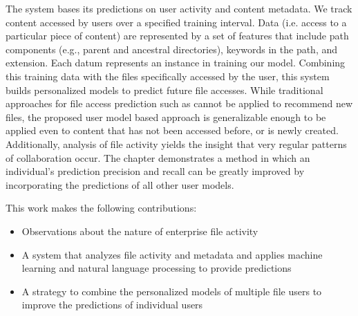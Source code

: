 {The system bases its predictions on user activity and content
metadata.  We track content accessed by users over a specified
training interval.  Data (i.e. access to a particular piece of
content) are represented by a set of features that include path
components (e.g., parent and ancestral directories), keywords in the
path, and extension.
Each datum represents an instance in training our model.  Combining
this training data with the files specifically accessed by the user,
this system builds personalized models to predict future file
accesses. While traditional approaches for file access prediction such
as \cite{yeh01-mascots,yeh01-ispass} cannot be applied to recommend
new files, the proposed user model based approach is generalizable
enough to be applied even to content that has not been accessed
before, or is newly created. Additionally, analysis of file activity
yields the insight that very regular patterns of collaboration occur.
The chapter demonstrates a method in which an individual's prediction
precision and recall can be greatly improved by incorporating the
predictions of all other user models.

This work makes the following contributions:
\begin{itemize}
\item Observations about the nature of enterprise file activity
\item A system that analyzes file activity and metadata and applies
  machine learning and natural language processing to provide
  predictions
\item A strategy to combine the personalized models of multiple file
  users to improve the predictions of individual users
\end{itemize}

}
